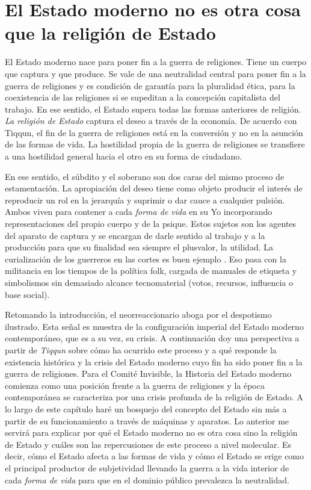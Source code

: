 \chapter{El Estado moderno no es otra cosa que la religión de Estado}
\label{cha:el-estado-moderno}

El Estado moderno nace para poner fin a la guerra de religiones. Tiene un cuerpo que captura y que produce. Se vale de una neutralidad central para poner fin a la guerra de religiones y es condición de garantía para la pluralidad ética, para la coexistencia de las religiones si se supeditan a la concepción capitalista del trabajo. En ese sentido, el Estado supera todas las formas anteriores de religión. \emph{La religión de Estado} captura el deseo a través de la economía. De acuerdo con Tiqqun, el fin de la guerra de religiones está en la conversión y no en la asunción de las formas de vida. La hostilidad propia de la guerra de religiones se transfiere a una hostilidad general hacia el otro en su forma de ciudadano.

En ese sentido, el súbdito y el soberano son dos caras del mismo proceso de estamentación. La apropiación del deseo tiene como objeto producir el interés de reproducir un rol en la jerarquía y suprimir o dar cauce a cualquier pulsión. Ambos viven para contener a cada \emph{forma de vida} en su Yo incorporando representaciones del propio cuerpo y de la psique. Estos sujetos son los agentes del aparato de captura y se encargan de darle sentido al trabajo y a la producción para que su finalidad sea siempre el plusvalor, la utilidad. La curialización de los guerreros en las cortes es buen ejemplo \autocite{tiqqunIntroduccionGuerraCivil2008}. Eso pasa con la militancia en los tiempos de la política folk, cargada de manuales de etiqueta y simbolismos sin demasiado alcance tecnomaterial (votos, recursos, influencia o base social).

Retomando la introducción, el neorreaccionario aboga por el despotismo ilustrado. Esta señal es muestra de la configuración imperial del Estado moderno contemporáneo, que es a su vez, su crisis. A continuación doy una perspectiva a partir de \emph{Tiqqun} sobre cómo ha ocurrido este proceso y a qué responde la existencia histórica y la crisis del Estado moderno cuyo fin ha sido poner fin a la guerra de religiones. Para el Comité Invisible, la Historia del Estado moderno comienza como una posición frente a la guerra de religiones y la época contemporánea se caracteriza por una crisis profunda de la religión de Estado. A lo largo de este capítulo haré un bosquejo del concepto del Estado sin más a partir de su funcionamiento a través de máquinas y aparatos. Lo anterior me servirá para explicar por qué el Estado moderno no es otra cosa sino la religión de Estado y cuáles son las repercusiones de este proceso a nivel molecular. Es decir, cómo el Estado afecta a las formas de vida y cómo el Estado se erige como el principal productor de subjetividad llevando la guerra a la vida interior de cada \emph{forma de vida} para que en el dominio público prevalezca la neutralidad.

